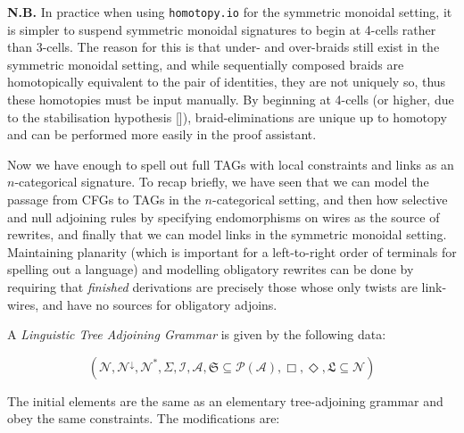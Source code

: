 \begin{fullwidth}
\begin{example}
\textbf{N.B.} In practice when using \texttt{homotopy.io} for the symmetric monoidal setting, it is simpler to suspend symmetric monoidal signatures to begin at 4-cells rather than 3-cells. The reason for this is that under- and over-braids still exist in the symmetric monoidal setting, and while sequentially composed braids are homotopically equivalent to the pair of identities, they are not uniquely so, thus these homotopies must be input manually. By beginning at 4-cells (or higher, due to the stabilisation hypothesis []), braid-eliminations are unique up to homotopy and can be performed more easily in the proof assistant.
\end{example}

Now we have enough to spell out full TAGs with local constraints and links as an $n$-categorical signature. To recap briefly, we have seen that we can model the passage from CFGs to TAGs in the $n$-categorical setting, and then how selective and null adjoining rules by specifying endomorphisms on wires as the source of rewrites, and finally that we can model links in the symmetric monoidal setting. Maintaining planarity (which is important for a left-to-right order of terminals for spelling out a language) and modelling obligatory rewrites can be done by requiring that \emph{finished} derivations are precisely those whose only twists are link-wires, and have no sources for obligatory adjoins.

\begin{defn}

A \emph{Linguistic Tree Adjoining Grammar} is given by the following data:

\[(\mathcal{N}, \mathcal{N}^\downarrow, \mathcal{N}^*, \Sigma, \mathcal{I}, \mathcal{A}, \mathfrak{S} \subseteq \mathcal{P}(\mathcal{A}), \Box, \Diamond, \mathfrak{L} \subseteq \mathcal{N})\]

The initial elements are the same as an elementary tree-adjoining grammar and obey the same constraints. The modifications are:


\end{defn}
\end{fullwidth}
